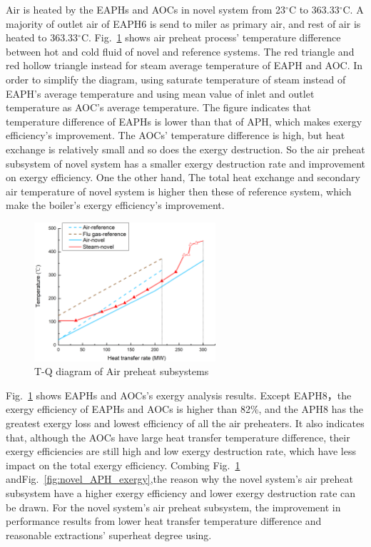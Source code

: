 \documentclass[preprint,12pt]{elsarticle}
\begin{document}
Air is heated by the EAPHs and AOCs in novel system from 23$^\circ$C to 363.33$^\circ$C. 
A majority of outlet air of EAPH6 is send to miler as primary air, and rest of air is heated to 363.33$^\circ$C.
Fig.~\ref{fig:APH_temper_compare} shows air preheat process' temperature difference between hot and cold fluid of novel and reference systems.
The red triangle and red hollow triangle instead for steam average temperature of EAPH and AOC. 
In order to simplify the diagram, using saturate temperature of steam instead of EAPH's average temperature and using mean value of inlet and outlet temperature as AOC's average temperature.
The figure indicates that  temperature difference of EAPHs is lower than that of APH, which makes exergy efficiency's improvement.
The AOCs' temperature difference is high, but heat exchange is relatively small and so does the exergy destruction. 
So the air preheat subsystem  of novel system has a smaller exergy destruction rate and improvement on exergy efficiency.
One the other hand, The total heat exchange  and secondary air temperature of novel system is higher then these of reference system, which make the boiler's exergy efficiency's improvement.

\begin{figure}[htbp]
\centering
\includegraphics[width=0.6\textwidth]{fig/APH_temper_compare.png}
\caption{T-Q diagram of Air preheat subsystems} 
\label{fig:APH_temper_compare}
\end{figure}

Fig.~\ref{fig:APH_temper_compare} shows EAPHs and AOCs's exergy analysis results. 
Except EAPH8，the exergy efficiency of EAPHs and AOCs is higher than 82\%, and the APH8 has the greatest exergy loss and lowest efficiency of all the air preheaters. 
It also indicates that, although the AOCs have large heat transfer temperature difference, their exergy efficiencies are still high and low exergy destruction rate, which have less impact on the total exergy efficiency.
Combing Fig.~\ref{fig:APH_temper_compare} andFig.~\ref{fig:novel_APH_exergy},the reason why the novel system's air preheat subsystem have a higher exergy efficiency and lower exergy destruction rate can be drawn.
For the novel system's air preheat subsystem, the improvement in performance results from lower heat transfer temperature difference and reasonable extractions' superheat degree using.
\end{document}
